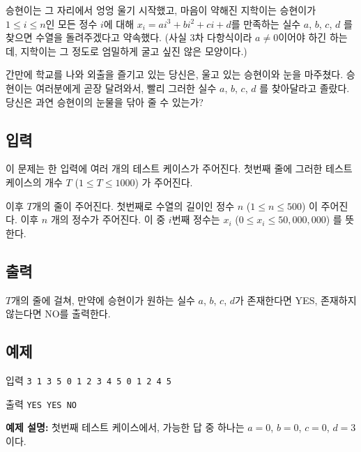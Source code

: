 \documentclass{article}
\begin{document}
승현이는 그 자리에서 엉엉 울기 시작했고, 마음이 약해진 지학이는 승현이가 $1 \leq i \leq n$인 모든 정수 $i$에 대해 $x_i = ai^3 + bi^2 + ci + d$를 만족하는 실수 $a$, $b$, $c$, $d$ 를 찾으면 수열을 돌려주겠다고 약속했다. (사실 3차 다항식이라 $a \neq 0$이어야 하긴 하는데, 지학이는 그 정도로 엄밀하게 굴고 싶진 않은 모양이다.) \newline

간만에 학교를 나와 외출을 즐기고 있는 당신은, 울고 있는 승현이와 눈을 마주쳤다. 승현이는 여러분에게 곧장 달려와서, 빨리 그러한 실수 $a$, $b$, $c$, $d$ 를 찾아달라고 졸랐다. 당신은 과연 승현이의 눈물을 닦아 줄 수 있는가?

\subsection{입력}
이 문제는 한 입력에 여러 개의 테스트 케이스가 주어진다. 첫번째 줄에 그러한 테스트 케이스의 개수 $T$ ($1 \leq T \leq 1000$) 가 주어진다. \newline

이후 $T$개의 줄이 주어진다. 첫번째로 수열의 길이인 정수 $n$ ($1 \leq n \leq 500$) 이 주어진다. 이후 $n$ 개의 정수가 주어진다. 이 중 $i$번째 정수는 $x_i$ ($0 \leq x_i \leq 50,000,000$) 를 뜻한다.


\subsection{출력}
$T$개의 줄에 걸쳐, 만약에 승현이가 원하는 실수 $a$, $b$, $c$, $d$가 존재한다면 YES, 존재하지 않는다면 NO를 출력한다.

\subsection{예제}
입력
\bgroup\obeylines
\texttt{3
	1 3
	5 0 1 2 3 4
	5 0 1 2 4 5	\newline}
\egroup

출력
\bgroup\obeylines
\texttt{YES
	YES
	NO \newline}
\egroup

\textbf{예제 설명:} 첫번째 테스트 케이스에서, 가능한 답 중 하나는 $a = 0$, $b = 0$, $c = 0$, $d = 3$ 이다.



\newpage

\end{document}
